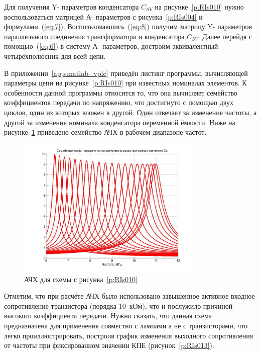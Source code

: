 Для получения Y- параметров конденсатора $C_{SV}$ на рисунке~\ref{p:RIs010} нужно воспользоваться  матрицей  А-  параметров  с  рисунка~\ref{p:RIs004}  и  формулами~(\ref{eq:7}). Воспользовавшись~(\ref{eq:8})  получим  матрицу  Y-  параметров  параллельного соединения трансформатора и конденсатора $C_{SV}$. Далее  перейдя с помощью~(\ref{eq:6}) в систему А- параметров, достроим эквивалентный четырёхполюсник для всей цепи.  


В  приложении~\ref{app:matlab_vplc}  приведён  листинг  программы,  вычисляющей параметры  цепи  на  рисунке~\ref{p:RIs010}  при  известных  номиналах  элементов.  К особенности данной программы относится то, что она вычисляет семейство коэффициентов  передачи  по  напряжению, что достигнуто с помощью двух циклов,  один  из  которых  вложен  в  другой.  Один  отвечает  за  изменение частоты, а другой за изменение номинала конденсатора переменной ёмкости. Ниже на рисунке~\ref{p:RIs012} приведено семейство АЧХ в рабочем диапазоне частот. 


\begin{figure}[H] \centering
  \includegraphics[width=0.8\textwidth]{./content/RIs012.jpg}
  \caption{АЧХ для схемы с рисунка~\ref{p:RIs010}} \label{p:RIs012}
\end{figure}


Отметим, что при расчёте АЧХ было использовано  завышенное активное входное сопротивление транзистора (порядка 10~кОм), что и послужило причиной высокого коэффициента передачи. Нужно сказать, что данная схема предназначена для применения совместно с лампами а не с транзисторами, что легко проиллюстрировать, построив график изменения выходного сопротивления от частоты при фиксированном значении КПЕ (рисунок~\ref{p:RIs013}). 


